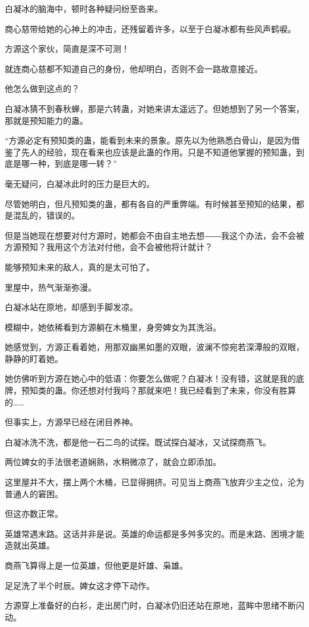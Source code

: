 \begin{this_body}
白凝冰的脑海中，顿时各种疑问纷至沓来。

商心慈带给她的心神上的冲击，还残留着许多，以至于白凝冰都有些风声鹤唳。

方源这个家伙，简直是深不可测！

就连商心慈都不知道自己的身份，他却明白，否则不会一路故意接近。

他怎么做到这点的？

白凝冰猜不到春秋蝉，那是六转蛊，对她来讲太遥远了。但她想到了另一个答案，那就是预知能力的蛊。

“方源必定有预知类的蛊，能看到未来的景象。原先以为他熟悉白骨山，是因为借鉴了先人的经验，现在看来也应该是此蛊的作用。只是不知道他掌握的预知蛊，到底是哪一种，到底是哪一转？”

毫无疑问，白凝冰此时的压力是巨大的。

尽管她明白，但凡预知类的蛊，都有各自的严重弊端。有时候甚至预知的结果，都是混乱的，错误的。

但是当她现在想要对付方源时，她都会不由自主地去想――我这个办法，会不会被方源预知？我用这个方法对付他，会不会被他将计就计？

能够预知未来的敌人，真的是太可怕了。

里屋中，热气渐渐弥漫。

白凝冰站在原地，却感到手脚发凉。

模糊中，她依稀看到方源躺在木桶里，身旁婢女为其洗浴。

她感觉到，方源正看着她，用那双幽黑如墨的双眼，波澜不惊宛若深潭般的双眼，静静的盯着她。

她仿佛听到方源在她心中的低语：你要怎么做呢？白凝冰！没有错，这就是我的底牌，预知类的蛊。你还想对付我吗？那就来吧！我已经看到了未来，你没有胜算的……

但事实上，方源早已经在闭目养神。

白凝冰洗不洗，都是他一石二鸟的试探。既试探白凝冰，又试探商燕飞。

两位婢女的手法很老道娴熟，水稍微凉了，就会立即添加。

这里屋并不大，摆上两个木桶，已显得拥挤。可见当上商燕飞放弃少主之位，沦为普通人的窘困。

但这亦数正常。

英雄常遇末路。这话并非是说。英雄的命运都是多舛多灾的。而是末路、困境才能造就出英雄。

商燕飞算得上是一位英雄，但他更是奸雄、枭雄。

足足洗了半个时辰。婢女这才停下动作。

方源穿上准备好的白衫，走出房门时，白凝冰仍旧还站在原地，蓝眸中思绪不断闪动。


\end{this_body}
